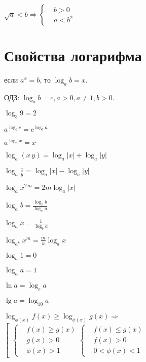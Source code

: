 $ \sqrt{a} < b \Rightarrow \left\{ \begin{aligned}
		& b > 0 \\
		& a < b^2
	\end{aligned} \right. $


\section{Свойства логарифма}

\begin{center}
	если $ a^x = b $, то $ \log_a b = x $.
\end{center}

ОДЗ: $ \log_a b = c, a > 0, a \neq 1, b > 0. $

$ \log_3 9 = 2 $

$ a^{\log_b c} = c^{\log_b a} $

$ a^{\log_a x} = x $

$ \log_a (x\, y) = \log_a |x| + \log_a |y| $

$ \log_a \frac{x}{y} = \log_a |x| - \log_a |y| $

$ \log_a x^{2\, m} = 2m \log_a |x| $

$ \log_a b = \frac{\log_x b}{\log_x a} $

$ \log_a x = \frac{1}{\log_b a} $

$ \log_{a^k} x^m = \frac{m}{k} \log_a x $

$ \log_a 1 = 0 $

$ \log_a a = 1 $

$ \ln a = \log_e a $

$ \lg a = \log_{10} a $

$ \log_{\phi(x)} f(x) \ge \log_{\phi(x)} g(x) \Rightarrow $ $ \left[
\begin{aligned}
	\left\{ \begin{aligned}
		& f(x) \ge g(x) \\
		& g(x) > 0 \\
		& \phi(x) > 1
	\end{aligned} \right.
	\left\{ \begin{aligned}
		& f(x) \le g(x) \\
		& f(x) > 0 \\
		& 0 < \phi(x) < 1
	\end{aligned} \right.
\end{aligned} \right. $

	
